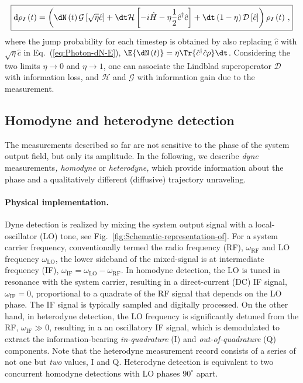 \begin{equation}
\boxed{\mathrm{d}\rho_{I}\left(t\right)=\left(\dN\left(t\right)\mathcal{G}\left[\sqrt{\eta}\hat{c}\right]+\dt\mathcal{H}\left[-i\hat{H}-\eta\frac{1}{2}\hat{c}^{\dagger}\hat{c}\right]+\dt\left(1-\eta\right)\mathcal{D}\left[\hat{c}\right]\right)\rho_{I}\left(t\right)\,,}\label{eq:photon:SME-loss}
\end{equation}
where the jump probability for each timestep is obtained by also replacing
$\hat{c}$ with $\sqrt{\eta}\hat{c}$ in Eq.~(\ref{eq:Photon-dN-E}),
$\E{\dN\left(t\right)}=\eta\Tr{\hat{c}^{\dagger}\hat{c}\rho}\dt$.
Considering the two limits $\eta\rightarrow0$ and $\eta\rightarrow1$,
one can associate the Lindblad superoperator $\mathcal{D}$ with information
loss, and $\mathcal{H}$ and $\mathcal{G}$ with information gain
due to the measurement.


\subsection{Homodyne and heterodyne detection\label{subsec:Homodyne-and-heterodyne}}

The measurements described so far are not sensitive to the phase of
the system output field, but only its amplitude. In the following,
we describe \emph{dyne} measurements\emph{, homodyne} or \emph{heterodyne,
}which provide information about the phase and a qualitatively different
(diffusive) trajectory unraveling.

\paragraph{Physical implementation. }

Dyne detection is realized by mixing the system output signal with
a local-oscillator (LO) tone, see Fig.~\ref{fig:Schematic-representation-of}.
For a system carrier frequency, conventionally termed the radio frequency
(RF), $\omega_{\mathrm{RF}}$ and LO frequency $\omega_{\mathrm{LO}}$,
the lower sideband of the mixed-signal is at intermediate frequency
(IF), $\omega_{\mathrm{IF}}=\omega_{\mathrm{LO}}-\omega_{\mathrm{RF}}$.
In homodyne detection, the LO is tuned in resonance with the system
carrier, resulting in a direct-current (DC) IF signal, $\omega_{\mathrm{IF}}=0$,
proportional to a quadrate of the RF signal that depends on the LO
phase. The IF signal is typically sampled and digitally processed.
On the other hand, in heterodyne detection, the LO frequency is significantly
detuned from the RF, $\omega_{\mathrm{IF}}\gg0$, resulting in a an
oscillatory IF signal, which is demodulated to extract the information-bearing
\emph{in-quadrature} (I) and \emph{out-of-quadrature }(Q) components.
Note that the heterodyne measurement record consists of a series of
not one but \emph{ two} values, I and Q. Heterodyne detection is equivalent
to two concurrent homodyne detections with LO phases $90^{\circ}$
apart. 

